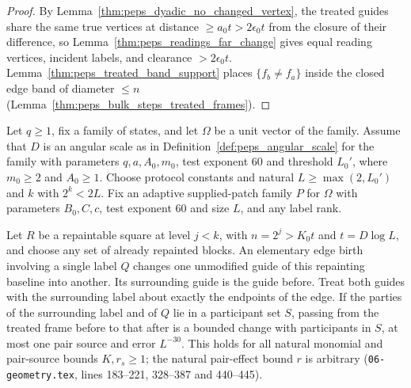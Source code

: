 \begin{proof}\leanok
    By Lemma~\ref{thm:peps_dyadic_no_changed_vertex}, the treated guides share the same true vertices at distance $\ge a_0t>2\epsilon_0t$ from the closure of their difference, so Lemma~\ref{thm:peps_readings_far_change} gives equal reading vertices, incident labels, and clearance $>2\epsilon_0t$. Lemma~\ref{thm:peps_treated_band_support} places $\{f_b\ne f_a\}$ inside the closed edge band of diameter $\le n$ (Lemma~\ref{thm:peps_bulk_steps_treated_frames}).
\end{proof}

\begin{lemma}
    \label{thm:peps_protocol_band_step_changes}
    \leanok
    Let $q\ge1$, fix a family of states, and let $\Omega$ be a unit vector of the family.
    Assume that $D$ is an angular scale as in Definition~\ref{def:peps_angular_scale} for
    the family with parameters $q,a,A_0,m_0$, test
    exponent $60$ and threshold $L_0'$, where $m_0\ge2$ and $A_0\ge1$. Choose protocol
    constants and natural $L\ge\max(2,L_0')$ and $k$ with $2^k<2L$. Fix an adaptive
    supplied-patch family $P$ for $\Omega$ with parameters $B_0,C,c$, test exponent $60$ and
    size $L$, and any label rank.

    Let $R$ be a repaintable square at level $j<k$, with $n=2^j>K_0t$ and $t=D\log L$, and
    choose any set of already repainted blocks. An elementary edge birth involving a single
    label $Q$ changes one unmodified guide of this repainting baseline into another. Its
    surrounding guide is the guide before. Treat both guides with the surrounding label about
    exactly the endpoints of the edge. If the parties of the surrounding label and of $Q$ lie
    in a participant set $S$, passing from the treated frame before to that after is a bounded
    change with participants in $S$, at most one pair source and error $L^{-30}$. This holds
    for all natural monomial and pair-source bounds $K,r_s\ge1$; the natural pair-effect bound
    $r$ is arbitrary (\texttt{06-geometry.tex}, lines 183--221, 328--387 and 440--445).
\end{lemma}

